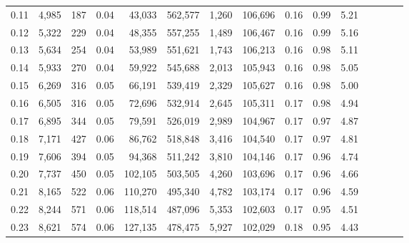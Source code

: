 \begin{tabular}{rrrcrrrrrrrrrrr}
0.11 &   4,985 &    187 &                                       0.04 &   43,033 &  562,577 &    1,260 &  106,696 &  0.16 &  0.99 &                         5.21 \\
0.12 &   5,322 &    229 &                                       0.04 &   48,355 &  557,255 &    1,489 &  106,467 &  0.16 &  0.99 &                         5.16 \\
0.13 &   5,634 &    254 &                                       0.04 &   53,989 &  551,621 &    1,743 &  106,213 &  0.16 &  0.98 &                         5.11 \\
0.14 &   5,933 &    270 &                                       0.04 &   59,922 &  545,688 &    2,013 &  105,943 &  0.16 &  0.98 &                         5.05 \\
0.15 &   6,269 &    316 &                                       0.05 &   66,191 &  539,419 &    2,329 &  105,627 &  0.16 &  0.98 &                         5.00 \\
0.16 &   6,505 &    316 &                                       0.05 &   72,696 &  532,914 &    2,645 &  105,311 &  0.17 &  0.98 &                         4.94 \\
0.17 &   6,895 &    344 &                                       0.05 &   79,591 &  526,019 &    2,989 &  104,967 &  0.17 &  0.97 &                         4.87 \\
0.18 &   7,171 &    427 &                                       0.06 &   86,762 &  518,848 &    3,416 &  104,540 &  0.17 &  0.97 &                         4.81 \\
0.19 &   7,606 &    394 &                                       0.05 &   94,368 &  511,242 &    3,810 &  104,146 &  0.17 &  0.96 &                         4.74 \\
0.20 &   7,737 &    450 &                                       0.05 &  102,105 &  503,505 &    4,260 &  103,696 &  0.17 &  0.96 &                         4.66 \\
0.21 &   8,165 &    522 &                                       0.06 &  110,270 &  495,340 &    4,782 &  103,174 &  0.17 &  0.96 &                         4.59 \\
0.22 &   8,244 &    571 &                                       0.06 &  118,514 &  487,096 &    5,353 &  102,603 &  0.17 &  0.95 &                         4.51 \\
0.23 &   8,621 &    574 &                                       0.06 &  127,135 &  478,475 &    5,927 &  102,029 &  0.18 &  0.95 &                         4.43 \\

\end{tabular}
